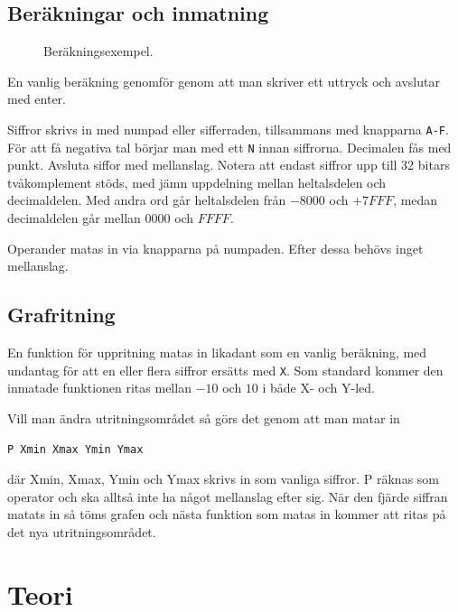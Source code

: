 \documentclass[]{article}
\begin{document}
\subsection{Beräkningar och inmatning}
\begin{figure}[h!]
	\caption{Beräkningsexempel.}
\end{figure}
\noindent
En vanlig beräkning genomför genom att man skriver ett uttryck och avslutar med enter. 

Siffror skrivs in med numpad eller sifferraden, tillsammans med knapparna \texttt{A-F}. För att få negativa tal börjar man med ett \texttt{N} innan siffrorna. Decimalen fås med punkt. Avsluta siffor med mellanslag. Notera att endast siffror upp till 32 bitars tvåkomplement stöds, med jämn uppdelning mellan heltalsdelen och decimaldelen. Med andra ord går heltalsdelen från $-8000$ och $+7FFF$, medan decimaldelen går mellan $0000$ och $FFFF$.

Operander matas in via knapparna på numpaden. Efter dessa behövs inget mellanslag.

\subsection{Grafritning}
En funktion för uppritning matas in likadant som en vanlig beräkning, med undantag för att en eller flera siffror ersätts med \texttt{X}. Som standard kommer den inmatade funktionen ritas mellan $-10$ och $10$ i både X- och Y-led.

Vill man ändra utritningsområdet så görs det genom att man matar in 
\begin{Verbatim}[frame=single]
P Xmin Xmax Ymin Ymax
\end{Verbatim}
där Xmin, Xmax, Ymin och Ymax skrivs in som vanliga siffror. P räknas som operator och ska alltså inte ha något mellanslag efter sig. När den fjärde siffran matats in så töms grafen och nästa funktion som matas in kommer att ritas på det nya utritningsområdet.

\newpage
\section{Teori}
\end{document}
